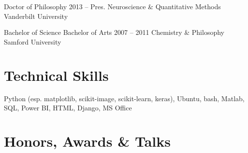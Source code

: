 \documentclass{tccv}
\begin{document}
\begin{yearlist}

\item[Doctor of Philosophy]{2013 -- Pres.}
     {Neuroscience \& \newline Quantitative Methods}
     {Vanderbilt University}
\item[Bachelor of Science \newline Bachelor of Arts]{2007 -- 2011}
     {Chemistry \& Philosophy}
     {Samford University}
\end{yearlist}


\section{Technical Skills}

\begin{factlist}

\item{}
     {Python (esp. matplotlib, scikit-image, scikit-learn, keras), Ubuntu, bash,  Matlab, SQL, Power BI, HTML, Django, MS Office}

\end{factlist}


\section{Honors, Awards \& Talks}
\end{document}

